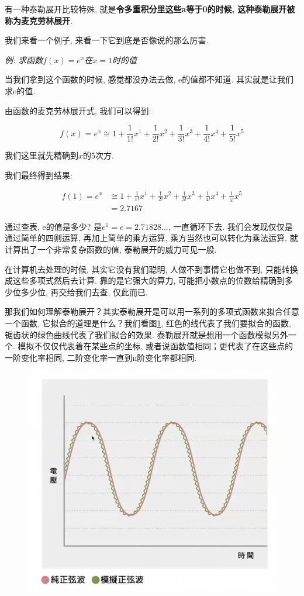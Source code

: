 有一种泰勒展开比较特殊, 就是\textbf{令多重积分里这些a等于0的时候, 这种泰勒展开被称为麦克劳林展开}. 

我们来看一个例子, 来看一下它到底是否像说的那么厉害. 

\textit{例: 求函数$f(x) = e^x$在$x=1$时的值}

当我们拿到这个函数的时候, 感觉都没办法去做, e的值都不知道. 其实就是让我们求e的值. 

由函数的麦克劳林展开式, 我们可以得到:

\[
  f(x) = e^x \cong 1 + \frac{1}{1!}x^1 + \frac{1}{2!}x^2 + \frac{1}{3!}x^3 +\frac{1}{4!}x^4 + \frac{1}{5!}x^5
\]

我们这里就先精确到$x$的5次方. 

我们最终得到结果: 

\begin{align*}
  f(1) = e^x & \cong 1 + \frac{1}{1!}x^1 + \frac{1}{2!}x^2 + \frac{1}{3!}x^3 +\frac{1}{4!}x^4 + \frac{1}{5!}x^5 \\
  & = 2.7167
\end{align*}

通过查表, e的值是多少? 是$e^1 = e = 2.71828...$, 一直循环下去. 我们会发现仅仅是通过简单的四则运算, 再加上简单的乘方运算, 乘方当然也可以转化为乘法运算. 就计算出了一个非常复杂函数的值, 泰勒展开的威力可见一般. 

在计算机去处理的时候, 其实它没有我们聪明, 人做不到事情它也做不到, 只能转换成这些多项式然后去计算. 靠的是它强大的算力, 可能把小数点的位数给精确到多少位多少位, 再交给我们去查, 仅此而已. 

那我们如何理解泰勒展开？其实泰勒展开是可以用一系列的多项式函数来拟合任意一个函数, 它拟合的道理是什么？我们看图\ref{fig:img14_6}, 红色的线代表了我们要拟合的函数, 锯齿状的绿色曲线代表了我们拟合的效果. 泰勒展开就是想用一个函数模拟另外一个. 模拟不仅仅代表着在某些点的坐标, 或者说函数值相同；更代表了在这些点的一阶变化率相同, 二阶变化率一直到n阶变化率都相同. 

\begin{figure}[ht]
  \centering
  \includegraphics[width=0.8\linewidth]{asset/20230904180649.png}
  \caption{}
  \label{fig:img14_6}
\end{figure}


